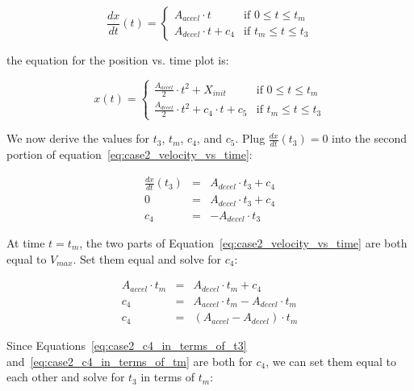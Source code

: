 \documentclass[11pt]{article} %
\begin{document}
\begin{equation}
\frac{dx}{dt}(t) = \left\{
  \begin{array}{rl}
     A_{accel}  \cdot t & \text{if } 0 \le t \le t_m\\
     A_{decel}  \cdot t + c_4 & \text{if } t_m \le t \le t_3
  \end{array} \right.
\label{eq:case2_velocity_vs_time}
\end{equation}

\noindent the equation for the position vs. time plot is:

\begin{equation}
x(t)  = \left\{
  \begin{array}{rl}
     \frac{A_{accel}}{2}  \cdot t^2 + X_{init} & \text{if } 0 \le t \le t_m\\
    \frac{A_{decel}}{2}  \cdot t^2 + c_4 \cdot t + c_5 & \text{if } t_m \le t \le t_3
  \end{array} \right.
\label{eq:case2_position_vs_time}
\end{equation}

\noindent We now derive the values for $t_3$, $t_m$, $c_4$, and $c_5$. Plug $\frac{dx}{dt}(t_3) = 0$ into the second portion of equation~\ref{eq:case2_velocity_vs_time}:

\begin{eqnarray}
\frac{dx}{dt}(t_3) & = &  A_{decel} \cdot t_3 + c_4 \nonumber \\
0 & = &  A_{decel} \cdot t_3 + c_4 \nonumber \\
c_4 & = & -A_{decel} \cdot t_3 \label{eq:case2_c4_in_terms_of_t3}
\end{eqnarray}

\noindent At time $t = t_m$, the two parts of Equation~\ref{eq:case2_velocity_vs_time} are both equal to $V_{max}$. Set them equal and solve for $c_4$:

\begin{eqnarray}
A_{accel} \cdot t_m & = & A_{decel} \cdot t_m + c_4 \nonumber \\
c_4 & = & A_{accel} \cdot t_m - A_{decel} \cdot t_m \nonumber \\
c_4 & = & (A_{accel} - A_{decel}) \cdot t_m \label{eq:case2_c4_in_terms_of_tm}
\end{eqnarray}

\noindent Since Equations~\ref{eq:case2_c4_in_terms_of_t3} and~\ref{eq:case2_c4_in_terms_of_tm} are both for $c_4$, we can set them equal to each other and solve for $t_3$ in terms of $t_m$:
\end{document}
